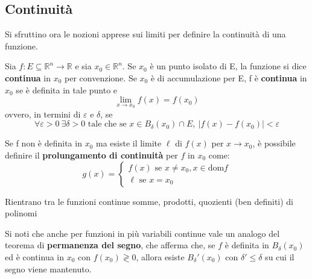 \subsection{Continuità}
Si sfruttino ora le nozioni apprese sui limiti per definire la continuità di una funzione.
\begin{definition} \label{Def: Continuità}
    Sia $f: E \subseteq \mathbb{R}^n \to \mathbb{R}$ e sia $x_0 \in \mathbb{R}^n$. Se $x_0$ è un punto isolato di E, la funzione si dice \textbf{continua} in $x_0$ per convenzione. Se $x_0$ è di accumulazione per E, f è \textbf{continua} in $x_0$ se è definita in tale punto e
    \begin{equation} \label{Eq: Continuità}
        \lim_{x \to x_0} f(x)= f(x_0)
    \end{equation}
    ovvero, in termini di $\varepsilon$ e $\delta$, se
    \begin{equation}
        \forall \varepsilon > 0 \  \exists \delta>0 \text{ tale che se } x \in B_\delta(x_0) \cap E, \ |f(x)-f(x_0)|< \varepsilon
    \end{equation} 
    \begin{oss}
        Se f non è definita in $x_0$ ma esiste il limite $\ell$ di $f(x)$ per $x \to x_0$, è possibile definire il \textbf{prolungamento di continuità} per $f$ in $x_0$ come:
        \begin{equation}
            g(x) = \begin{cases}
                f(x) \text{ se } x \neq x_0, x \in \text{dom}f\\
                \ell \text { se } x=x_0
            \end{cases}
        \end{equation}
    \end{oss}
    \begin{oss}
        Rientrano tra le funzioni continue somme, prodotti, quozienti (ben definiti) di polinomi
    \end{oss}
\end{definition}
\vspace*{\baselineskip}
Si noti che anche per funzioni in più variabili continue vale un analogo del teorema di \textbf{permanenza del segno}, che afferma che, se $f$ è definita in $B_\delta(x_0)$ ed è continua in $x_0$ con $f(x_0) \gtrless 0$, allora esiste $B_\delta'(x_0)$ con $\delta' \leq \delta$ su cui il segno viene mantenuto.
